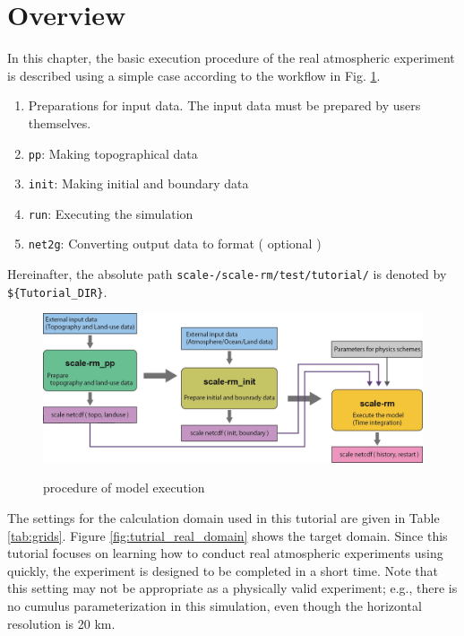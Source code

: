 \section{Overview} \label{sec:tutrial_real_intro}
In this chapter, the basic execution procedure of the real atmospheric experiment is described using a simple case according to the workflow in Fig. \ref{fig:howto}.
\begin{enumerate}
\item Preparations for input data. The input data must be prepared by users themselves.
\item \texttt{pp}:   Making topographical data
\item \texttt{init}: Making initial and boundary data
\item \texttt{run}:  Executing the simulation
\item \texttt{net2g}: Converting {\netcdf} output data to {\grads} format ( optional )
\end{enumerate}
Hereinafter, the absolute path \texttt{scale-{\version}/scale-rm/test/tutorial/} is denoted by\\
\verb|${Tutorial_DIR}|.

\begin{figure}[tb]
\begin{center}
  \includegraphics[width=0.9\hsize]{./figure/real_procedure.png}\\
  \caption{\scalerm procedure of model execution}
  \label{fig:howto}
\end{center}
\end{figure}

The settings for the calculation domain used in this tutorial are given in Table \ref{tab:grids}.
Figure \ref{fig:tutrial_real_domain} shows the target domain.
Since this tutorial focuses on learning how to conduct 
real atmospheric experiments using \scalerm quickly,
the experiment is designed to be completed in a short time.
Note that this setting may not be appropriate as a physically valid experiment;
e.g., there is no cumulus parameterization in this simulation, even though the horizontal resolution is 20 km.


